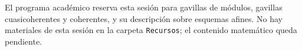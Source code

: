 \begin{nota}
El programa académico reserva esta sesión para gavillas de módulos, gavillas cuasicoherentes y coherentes, y su descripción sobre esquemas afines. No hay materiales de esta sesión en la carpeta \texttt{Recursos}; el contenido matemático queda pendiente.
\end{nota}
